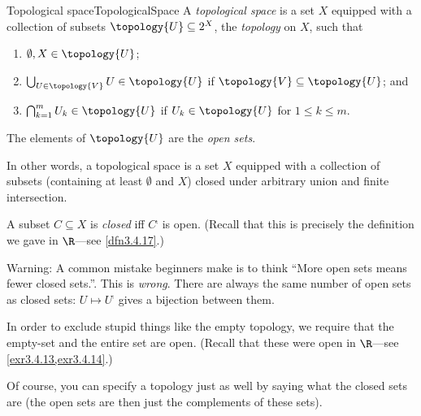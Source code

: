 \begin{dfn}{Topological space}{TopologicalSpace}
A \emph{topological space} is a set $X$ equipped with a collection of subsets $\topology{U}\subseteq 2^X$, the \emph{topology} on $X$, such that
\begin{enumerate}
\item \label{enmTopologicalSpace.i}$\emptyset ,X\in \topology{U}$;
\item \label{enmTopologicalSpace.ii}$\bigcup _{U\in \topology{V}}U\in \topology{U}$ if $\topology{V}\subseteq \topology{U}$; and
\item \label{enmTopologicalSpace.iii}$\bigcap _{k=1}^mU_k\in \topology{U}$ if $U_k\in \topology{U}$ for $1\leq k\leq m$.
\end{enumerate}
\begin{rmk}
The elements of $\topology{U}$ are the \emph{open sets}.
\end{rmk}
\begin{rmk}
In other words, a topological space is a set $X$ equipped with a collection of subsets (containing at least $\emptyset$ and $X$) closed under arbitrary union and finite intersection.
\end{rmk}
\begin{rmk}
A subset $C\subseteq X$ is \emph{closed} iff $C^{\comp}$ is open.  (Recall that this is precisely the definition we gave in $\R$---see \cref{dfn3.4.17}.)
\end{rmk}
\begin{wrn}
Warning:  A common mistake beginners make is to think ``More open sets means fewer closed sets.''.  This is \emph{wrong}.  There are always the same number of open sets as closed sets:  $U\mapsto U^{\comp}$ gives a bijection between them.
\end{wrn}
\begin{rmk}
In order to exclude stupid things like the empty topology, we require that the empty-set and the entire set are open.  (Recall that these were open in $\R$---see \cref{exr3.4.13,exr3.4.14}.)
\end{rmk}
\end{dfn}
Of course, you can specify a topology just as well by saying what the closed sets are (the open sets are then just the complements of these sets).
